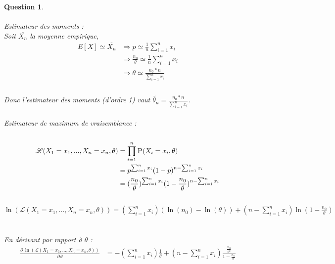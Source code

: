 \documentclass[a4paper,11pt]{article}
\newtheorem{exo1}{Question}
\begin{document}
\begin{exo1} \ \\ \\
Estimateur des moments : \ \\
Soit $\overline{X_{n}}$ la moyenne empirique, \ \\
\begin{equation}
\begin{aligned}
E[X] \simeq \overline{X_{n}} & \Rightarrow p \simeq \frac{1}{n}\sum_{i=1}^{n} x_{i} \ \\
& \Rightarrow \frac{n_{0}}{\theta} \simeq \frac{1}{n}\sum_{i=1}^{n} x_{i} \ \\
& \Rightarrow \theta \simeq \frac{n_{0}*n}{\sum_{i=1}^{n} x_{i}} \ \\
\end{aligned}
\end{equation} \ \\
Donc l'estimateur des moments (d'ordre 1) vaut $\tilde{\theta_{n}}=\frac{n_{0}*n}{\sum_{i=1}^{n} x_{i}}$. \ \\ \\
Estimateur de maximum de vraisemblance : \ \\ \\
\begin{equation}
\begin{aligned}
\mathscr{L}(X_{1}=x_{1},...,X_{n}=x_{n}, \theta) & = \prod_{i=1}^{n}\textsc{P}(X_{i}=x_{i}, \theta) \ \\
& = p^{\sum_{i=1}^{n} x_{i}}(1-p)^{n-\sum_{i=1}^{n} x_{i}} \ \\ 
& = (\frac{n_{0}}{\theta})^{\sum_{i=1}^{n}
x_{i}}(1-\frac{n_{0}}{\theta})^{n-\sum_{i=1}^{n} x_{i}} \ \\
\end{aligned}
\end{equation} \ \\
$\ln(\mathscr{L}(X_{1}=x_{1},...,X_{n}=x_{n}, \theta)) = (\sum_{i=1}^{n}x_{i})(\ln(n_{0})-\ln(\theta))+(n-\sum_{i=1}^{n} x_{i})\ln(1-\frac{n_{0}}{\theta})$ \ \\ \\
En dérivant par rapport à $\theta$ : \ \\
\begin{equation}
\begin{aligned}
\frac{\partial\,\ln(\mathscr{L}(X_{1}=x_{1},...,X_{n}=x_{n}, \theta))}{\partial\,\theta} & = -(\sum_{i=1}^{n} x_{i})\frac{1}{\theta}+(n-\sum_{i=1}^{n} x_{i})\frac{\frac{n_{0}}{\theta^{2}}}{1-\frac{n_{0}}{\theta}} \ \\

\end{aligned}
\end{equation}
\end{exo1}
\end{document}
